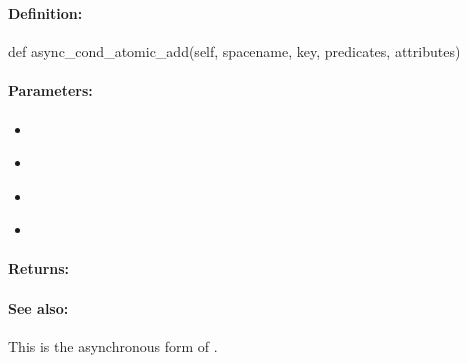 \pagebreak
\subsubsection{}
\label{api:python:async_cond_atomic_add}


\paragraph{Definition:}
\begin{pythoncode}
def async_cond_atomic_add(self, spacename, key, predicates, attributes)
\end{pythoncode}

\paragraph{Parameters:}
\begin{itemize}[noitemsep]
\item {}\\

\item {}\\

\item {}\\

\item {}\\

\end{itemize}

\paragraph{Returns:}


\paragraph{See also:}  This is the asynchronous form of .

\pagebreak
\subsubsection{}
\label{api:python:atomic_sub}


